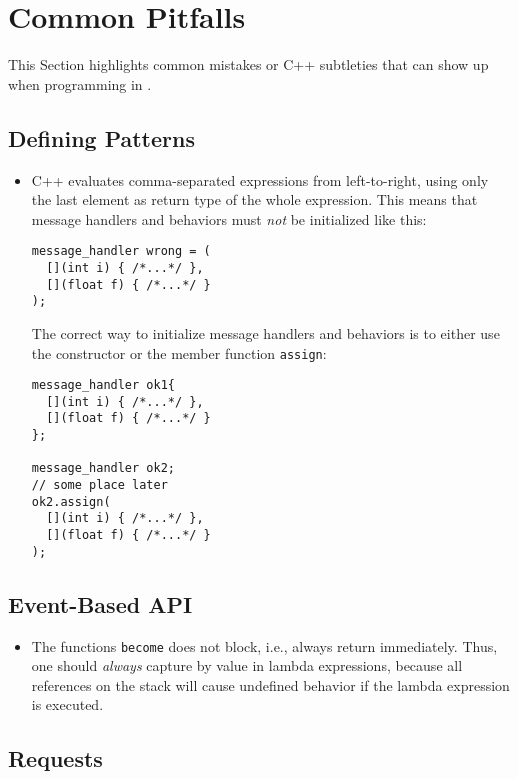 \section{Common Pitfalls}
\label{Sec::Pitfalls}

This Section highlights common mistakes or C++ subtleties that can show up when programming in \lib.

\subsection{Defining Patterns}

\begin{itemize}
\item C++ evaluates comma-separated expressions from left-to-right, using only the last element as return type of the whole expression. This means that message handlers and behaviors must \emph{not} be initialized like this:
\begin{lstlisting}
message_handler wrong = (
  [](int i) { /*...*/ },
  [](float f) { /*...*/ }
);
\end{lstlisting}
The correct way to initialize message handlers and behaviors is to either use the constructor or the member function \lstinline^assign^:
\begin{lstlisting}
message_handler ok1{
  [](int i) { /*...*/ },
  [](float f) { /*...*/ }
};

message_handler ok2;
// some place later
ok2.assign(
  [](int i) { /*...*/ },
  [](float f) { /*...*/ }
);
\end{lstlisting}
\end{itemize}

\subsection{Event-Based API}

\begin{itemize}
\item The functions \lstinline^become^ does not block, i.e., always return immediately.
Thus, one should \textit{always} capture by value in lambda expressions, because all references on the stack will cause undefined behavior if the lambda expression is executed.
\end{itemize}

\subsection{Requests}

